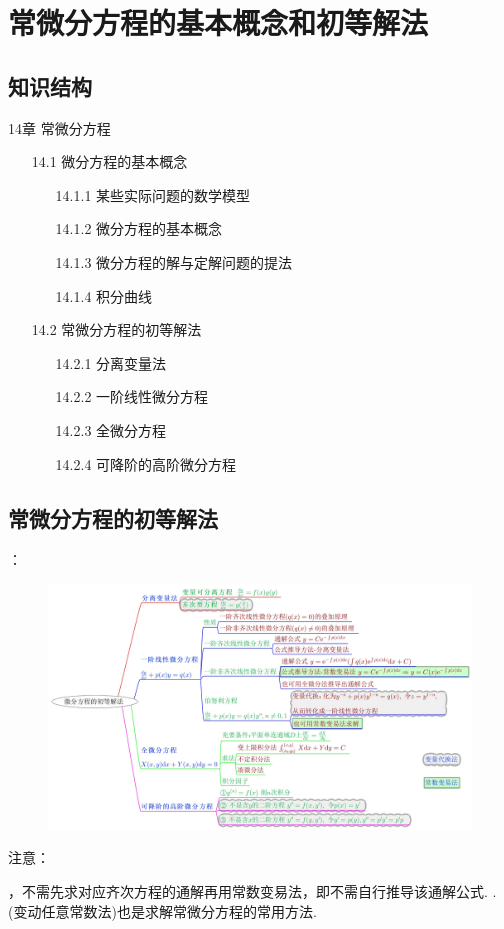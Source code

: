 \documentclass[12pt,UTF8]{ctexart}
\begin{document}
\setcounter{section}{25}
\section{常微分方程的基本概念和初等解法}
\subsection{知识结构}
14章 常微分方程
	\begin{enumerate}
		\item[14.1]微分方程的基本概念
			\begin{enumerate}
				\item[14.1.1]某些实际问题的数学模型
				\item[14.1.2]微分方程的基本概念
				\item[14.1.3]微分方程的解与定解问题的提法
				\item[14.1.4]积分曲线
			\end{enumerate}
		\item[14.2]常微分方程的初等解法
			\begin{enumerate}
				\item[14.2.1]分离变量法
				\item[14.2.2]一阶线性微分方程
				\item[14.2.3]全微分方程
				\item[14.2.4]可降阶的高阶微分方程
			\end{enumerate}
	\end{enumerate}
\subsection{常微分方程的初等解法}
\begin{enumerate}
：
\begin{figure}[H]
\begin{center}
\includegraphics[height=0.45\textheight]{Figures26/structures.jpg}
\end{center}
\end{figure}

注意：
\begin{enumerate}
，不需先求对应齐次方程的通解再用常数变易法，即不需自行推导该通解公式.
.
(变动任意常数法)也是求解常微分方程的常用方法.
\end{enumerate}
\end{enumerate}
\end{document}
